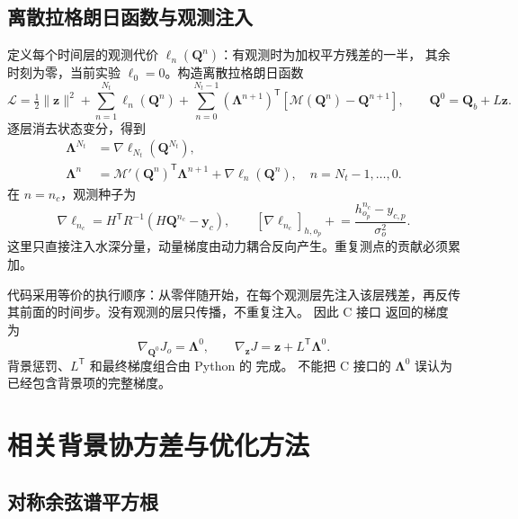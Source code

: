 \documentclass[12pt,a4paper]{article}
\newcommand{\Q}{\mathbf{Q}}
\newcommand{\LL}{\bm{\Lambda}}
\newcommand{\trans}{^{\mathsf T}}
\begin{document}
\subsection{离散拉格朗日函数与观测注入}

定义每个时间层的观测代价 $\ell_n(\Q^n)$：有观测时为加权平方残差的一半，
其余时刻为零，当前实验 $\ell_0=0$。构造离散拉格朗日函数
\begin{equation}
 \mathcal L=\tfrac12\|\mathbf z\|^2+\sum_{n=1}^{N_t}\ell_n(\Q^n)
 +\sum_{n=0}^{N_t-1}(\LL^{n+1})\trans
 [\mathcal M(\Q^n)-\Q^{n+1}],\qquad \Q^0=\Q_b+L\mathbf z.
 \label{eq:dta-lagrangian}
\end{equation}
逐层消去状态变分，得到
\begin{align}
 \LL^{N_t}&=\nabla\ell_{N_t}(\Q^{N_t}),\nonumber\\
 \LL^n&=\mathcal M'(\Q^n)\trans\LL^{n+1}+\nabla\ell_n(\Q^n),
 \quad n=N_t-1,\ldots,0.
 \label{eq:dta-recurrence}
\end{align}
在 $n=n_c$，观测种子为
\begin{equation}
 \nabla\ell_{n_c}=H\trans R^{-1}(H\Q^{n_c}-\mathbf y_c),\qquad
 [\nabla\ell_{n_c}]_{h,o_p}\mathrel{+}=
 \frac{h_{o_p}^{n_c}-y_{c,p}}{\sigma_o^2}.
 \label{eq:dta-observation-seed}
\end{equation}
这里只直接注入水深分量，动量梯度由动力耦合反向产生。重复测点的贡献必须累加。

代码采用等价的执行顺序：从零伴随开始，在每个观测层先注入该层残差，再反传
其前面的时间步。没有观测的层只传播，不重复注入。
因此 C 接口  返回的梯度为
\begin{equation}
 \nabla_{\Q^0}J_o=\LL^0,
 \qquad
 \boxed{\nabla_{\mathbf z}J=\mathbf z+L\trans\LL^0.}
 \label{eq:dta-control-gradient}
\end{equation}
背景惩罚、$L\trans$ 和最终梯度组合由 Python 的  完成。
不能把 C 接口的 $\LL^0$ 误认为已经包含背景项的完整梯度。

\section{相关背景协方差与优化方法}
\label{sec:dta-covariance}

\subsection{对称余弦谱平方根}
\end{document}
